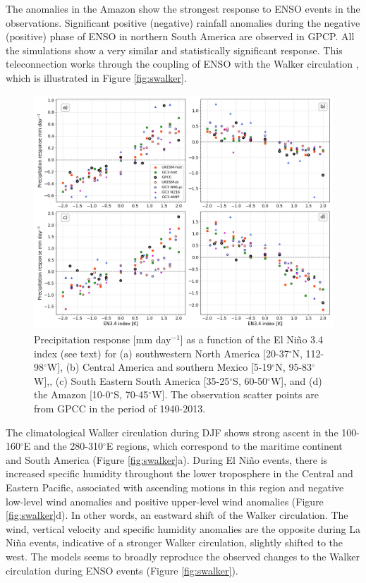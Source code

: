 The anomalies in the Amazon show the strongest response to ENSO events in the observations. Significant positive (negative) rainfall anomalies during the negative (positive) phase of ENSO in northern South America are observed in GPCP. All the simulations show a very similar and statistically significant response. This teleconnection works through the coupling of ENSO with the Walker circulation \citep{vera2006,cai2019pantropical}, which is illustrated in Figure \ref{fig:swalker}. 

\begin{figure}[t!]
\centering
 \includegraphics[width=\linewidth]{figures/fig_ensolinear}
\caption{ Precipitation response [mm day$^{-1}$] as a function of the El Ni\~no 3.4 index (see text) for (a) southwestern North America [20-37$^\circ$N, 112-98$^\circ$W], (b) Central America and southern Mexico [5-19$^\circ$N, 95-83$^\circ$W],, (c) South Eastern South America [35-25$^\circ$S, 60-50$^\circ$W], and (d) the Amazon [10-0$^\circ$S, 70-45$^\circ$W]. The observation scatter points are from GPCC in the period of 1940-2013.}
\label{fig:12}
\end{figure}

The climatological Walker circulation during DJF shows strong ascent in the 100-160$^\circ$E and the 280-310$^\circ$E regions, which correspond to the maritime continent and South America (Figure \ref{fig:swalker}a). During El Ni\~no events, there is increased specific humidity throughout the lower troposphere in the Central and Eastern Pacific, associated with ascending motions in this region and negative low-level wind anomalies and positive upper-level wind anomalies (Figure \ref{fig:swalker}d). In other words, an eastward shift of the Walker circulation. The wind, vertical velocity and specific humidity anomalies are the opposite during La Niña events, indicative of a stronger Walker circulation, slightly shifted to the west. 
The models seems to broadly reproduce the observed changes to the Walker circulation during ENSO events (Figure \ref{fig:swalker}).


